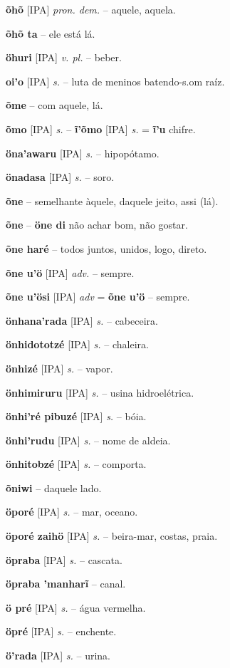 \textbf{õhõ} [IPA] \textit{pron. dem.} -- aquele, aquela.

\textbf{õhõ ta} -- ele está lá.

\textbf{öhuri} [IPA] \textit{v. pl.} -- beber.

\textbf{oi'o} [IPA] \textit{s.} -- luta de meninos batendo-s.om raíz.

\textbf{õme} -- com aquele, lá.

\textbf{õmo} [IPA] \textit{s.} -- \textbf{ĩ'õmo} [IPA] \textit{s.} = \textbf{ĩ'u} chifre.

\textbf{öna'awaru} [IPA] \textit{s.} -- hipopótamo.

\textbf{önadasa} [IPA] \textit{s.} -- soro.

\textbf{õne} -- semelhante àquele, daquele jeito, assi (lá).

\textbf{õne} -- \textbf{öne di} não achar bom, não gostar.

\textbf{õne haré} -- todos juntos, unidos, logo, direto.

\textbf{õne u'ö} [IPA] \textit{adv.} -- sempre.

\textbf{õne u'ösi} [IPA] \textit{adv} = \textbf{õne u'ö} -- sempre.

\textbf{önhana'rada} [IPA] \textit{s.} -- cabeceira.

\textbf{önhidototzé} [IPA] \textit{s.} -- chaleira.

\textbf{önhizé} [IPA] \textit{s.} -- vapor.

\textbf{önhimiruru} [IPA] \textit{s.} -- usina hidroelétrica.

\textbf{önhi'ré pibuzé} [IPA] \textit{s.} -- bóia.

\textbf{önhi'rudu} [IPA] \textit{s.} -- nome de aldeia.

\textbf{önhitobzé} [IPA] \textit{s.} -- comporta.

\textbf{õniwi} -- daquele lado.

\textbf{öporé} [IPA] \textit{s.} -- mar, oceano.

\textbf{öporé zaihö} [IPA] \textit{s.} -- beira-mar, costas, praia.

\textbf{öpraba} [IPA] \textit{s.} -- cascata.

\textbf{öpraba 'manharĩ} -- canal.

\textbf{ö pré} [IPA] \textit{s.} -- água vermelha.

\textbf{öpré} [IPA] \textit{s.} -- enchente.

\textbf{ö'rada} [IPA] \textit{s.} -- urina.

